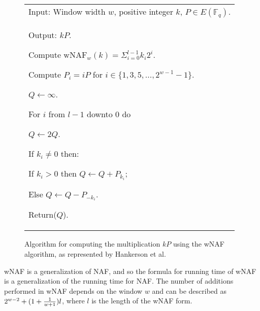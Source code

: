 \begin{figure}[htb!]
	\begin{tabular}{|p{\textwidth}|}
		\hline
		Input: Window width \(w\), positive integer \(k\), \(P \in E(\mathbb{F}_q)\).\\
		Output: \(kP\).
		\begin{enumerate*}
			\item Compute \(\text{wNAF}_w(k) = \Sigma^{l-1}_{i=0} k_i 2^i\).
			\item Compute \(P_i = iP\) for \(i \in \{1,3,5,...,2^{w-1}-1\}\).
			\item \(Q \gets \infty\).
			\item For \(i\) from \(l - 1\) downto \(0\) do
			\begin{enumerate*}
				\item \(Q \gets 2Q\).
				\item If \(k_i \neq 0\) then:
				\begin{enumerate*}
					\item If \(k_i > 0\) then \(Q \gets Q + P_{k_i}\);
					\item Else \(Q \gets Q - P_{-k_i}\).
				\end{enumerate*}
			\end{enumerate*}
			\item Return(\(Q\)).
		\end{enumerate*} \\
		\hline
	\end{tabular}
	\caption{Algorithm for computing the multiplication \(kP\) using the wNAF algorithm, as represented by Hankerson et al.\cite{hankerson2010}}
	\label{fig:wnaf-algorithm}
\end{figure}

wNAF is a generalization of NAF, and so the formula for running time of wNAF is a generalization of the running time for NAF. The number of
additions performed in wNAF depends on the window \(w\) and can be described as \(2^{w-2} + (1 + {1 \over {w + 1}}) l\), where \(l\) is the length
of the wNAF form.\cite{hankerson2010}